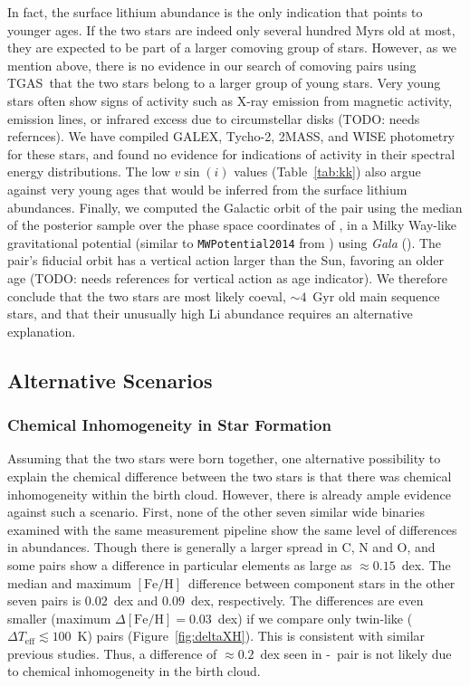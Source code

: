 \documentclass[12pt,letterpaper,margin=1in]{article}
\newcommand{\project}[1]{\textsl{#1}}
\newcommand{\acronym}[1]{{\small{#1}}}
\newcommand{\figname}{Figure}
\newcommand{\tgas}{\acronym{TGAS}}
\newcommand*\elem[1]{\ensuremath{\mathrm{#1}}}
\newcommand*\elemH[1]{\ensuremath{[\mathrm{#1}/\elem{H}]}}
\newcommand*{\feh}{\ensuremath{\elemH{Fe}}}
\newcommand{\sunanalog}{\text{Krios}}
\newcommand{\bizarreone}{\text{Kronos}}
\newcommand{\todo}[1]{{TODO: #1}}
\renewcommand\tablename{Table}
\begin{document}
In fact, the surface lithium abundance is the only indication that points to
younger ages.
If the two stars are indeed only several hundred Myrs old at most,
they are expected to be part of a larger comoving group of stars.
However, as we mention above, there is no evidence in our search of comoving pairs
using \tgas\ that the two stars belong to a larger group of young stars.
Very young stars often show signs of activity such as
X-ray emission from magnetic activity, emission lines, or infrared excess due to
circumstellar disks (\todo{needs refernces}).
We have compiled GALEX, Tycho-2, 2MASS, and WISE photometry for these stars,
and found no evidence for indications of activity in their spectral energy
distributions.
The low $v\sin(i)$ values (\tablename~\ref{tab:kk}) also argue against very
young ages that would be inferred from the surface lithium abundances.
Finally, we computed the Galactic orbit of the pair using the median of the
posterior sample over the phase space coordinates of \sunanalog, in a Milky
Way-like gravitational potential (similar to \texttt{MWPotential2014} from
\cite{Bovy:2015}) using \project{Gala} (\cite{gala}).
The pair's fiducial orbit has a vertical action larger than the Sun, favoring
an older age (\todo{needs references for vertical action as age indicator}).
We therefore conclude that the two stars are most likely coeval, $\sim 4$~Gyr
old main sequence stars, and that their unusually high \elem{Li} abundance
requires an alternative explanation.

\subsection{Alternative Scenarios}

\subsubsection{Chemical Inhomogeneity in Star Formation}
\label{sub:chemical_inhomogeneity_in_star_formation}

Assuming that the two stars were born together, one alternative possibility to
explain the chemical difference between the two stars is that there was
chemical inhomogeneity within the birth cloud.
However, there is already ample evidence against such a scenario.
First, none of the other seven similar wide binaries examined
with the same measurement pipeline\cite{2016ApJS..225...32B}
show the same level of differences in abundances.
Though there is generally a larger spread in $\elem{C}$, $\elem{N}$ and
$\elem{O}$, and some pairs show a difference in particular elements as large as
$\approx 0.15$~dex.
The median and maximum \feh\ difference between component stars in the other
seven pairs is $0.02$~dex and $0.09$~dex, respectively.
The differences are even smaller (maximum $\Delta\feh = 0.03$~dex) if we
compare only twin-like ($\Delta T_\mathrm{eff} \lesssim 100$~K) pairs
(\figname~\ref{fig:deltaXH}).
This is consistent with similar previous studies\cite{Gratton:2001aa,Desidera:2004aa}.
Thus, a difference of $\approx 0.2$~dex seen in \bizarreone-\sunanalog\ pair is
not likely due to chemical inhomogeneity in the birth cloud.
\end{document}

